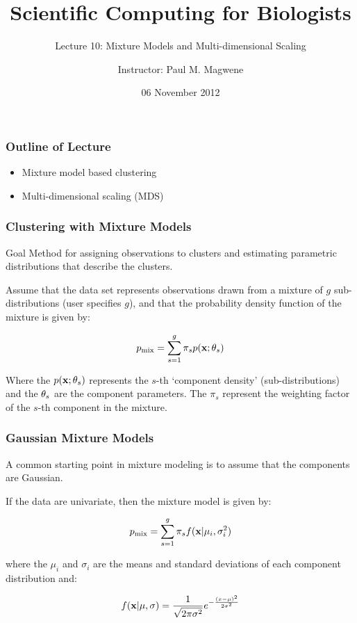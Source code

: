 \documentclass{beamer}
\title{Scientific Computing for Biologists}
\subtitle{Lecture 10: Mixture Models and Multi-dimensional Scaling} %
\author{Instructor: Paul M. Magwene}
\date{06 November 2012}
\begin{document}
\begin{frame}
\titlepage
\end{frame}



\begin{frame}
  \frametitle{Outline of Lecture}

\begin{itemize}
    \item Mixture model based clustering
    \item Multi-dimensional scaling (MDS)
\end{itemize}

\end{frame}



\begin{frame}
  \frametitle{Clustering with Mixture Models}

\begin{block}{Goal}
Method for assigning observations to clusters and estimating parametric distributions that describe the clusters.
\end{block}

    Assume that the data set represents observations drawn from a mixture of $g$ sub-distributions (user specifies $g$), and that the probability density function of the mixture is given by:

\[
p_{\mathrm{mix}} = \sum_{s=1}^g \pi_s p(\mathbf{x};\mathbf{\theta}_s)
\]

Where the $p(\mathbf{x};\mathbf{\theta}_s)$ represents the $s$-th `component density' (sub-distributions) and the $\mathbf{\theta}_s$ are the component parameters.  The $\pi_s$ represent the weighting factor of the $s$-th component in the mixture.

\end{frame}

{

}

\begin{frame}
  \frametitle{Gaussian Mixture Models}

A common starting point in mixture modeling is to assume that the components are Gaussian.

If the data are univariate, then the mixture model is given by:

\[
p_{\mathrm{mix}} = \sum_{s=1}^g \pi_s f(\mathbf{x}|\mu_i, \sigma_i^2)
\]

where the $\mu_i$ and $\sigma_i$ are the means and standard deviations of each component distribution and:

\[
f(\mathbf{x}|\mu, \sigma) = \frac{1}{\sqrt{2\pi\sigma^2}}e^{-\frac{(x-\mu)^2}{2\sigma^2}}
\]

\end{frame}
\end{document}
